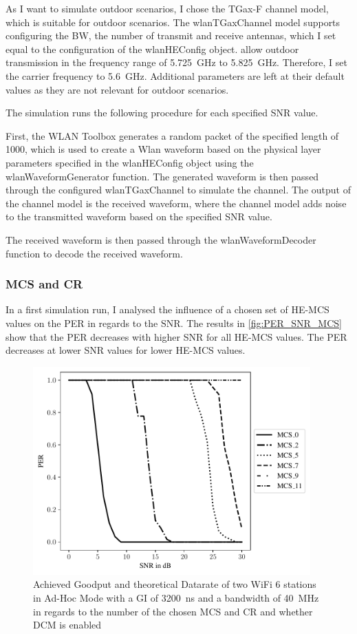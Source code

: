 As I want to simulate outdoor scenarios, I chose the TGax-F channel model, which is suitable for outdoor scenarios.
The wlanTGaxChannel model supports configuring the \ac{BW}, the number of transmit and receive antennas, which I set equal to the configuration of the wlanHEConfig object.
\cite{freq_plan} allow outdoor transmission in the frequency range of \SI{5.725}{\giga\hertz} to \SI{5.825}{\giga\hertz}. Therefore, I set the carrier frequency to \SI{5.6}{\giga\hertz}.
Additional parameters are left at their default values as they are not relevant for outdoor scenarios.

The simulation runs the following procedure for each specified \ac{SNR} value.

First, the WLAN Toolbox generates a random packet of the specified length of \SI{1000}{\byte}, which is used to create a
Wlan waveform based on the physical layer parameters specified in the wlanHEConfig object using the wlanWaveformGenerator function.
The generated waveform is then passed through the configured wlanTGaxChannel to simulate the channel. The output of the channel model is the received waveform, where
the channel model adds noise to the transmitted waveform based on the specified \ac{SNR} value.

The received waveform is then passed through the wlanWaveformDecoder function to decode the received waveform.

\subsubsection*{\acf{MCS} and \acf{CR}}
In a first simulation run, I analysed the influence of a chosen set of HE-MCS values on the \ac{PER} in regards to the \ac{SNR}.
The results in \autoref{fig:PER_SNR_MCS} show that the \ac{PER} decreases with higher \ac{SNR} for all HE-MCS values. The
\ac{PER} decreases at lower \ac{SNR} values for lower HE-MCS values.
\begin{figure}[H]%
	\centering
	\includegraphics[width=0.95\textwidth]{figures/MCS_PER_to_SNR.pdf}
	\caption{Achieved Goodput and theoretical Datarate of two WiFi 6 stations in Ad-Hoc Mode with a \ac{GI} of \SI{3200}{\nano\second} and a bandwidth of \SI{40}{\mega\hertz} in regards to the number of the chosen \ac{MCS} and \ac{CR} and whether \ac{DCM} is enabled}%
	\label{fig:PER_SNR_MCS}%
\end{figure}

